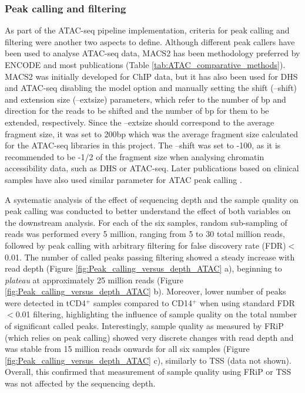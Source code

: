 \subsubsection{Peak calling and filtering}
\label{peak_filtering}
As part of the ATAC-seq pipeline implementation, criteria for peak calling and filtering were another two aspects to define. Although different peak callers have been used to analyse ATAC-seq data, MACS2 has been methodology preferred by ENCODE and most publications (Table \ref{tab:ATAC_comparative_methods}). MACS2 was initially developed for ChIP data, but it has also been used for DHS and ATAC-seq disabling the model option and manually setting the shift (--shift) and extension size (--extsize) parameters, which refer to the number of bp and direction for the reads to be shifted and the number of bp for them to be extended, respectively. Since the --extsize should correspond to the average fragment size, it was set to 200bp which was the average fragment size calculated for the ATAC-seq libraries in this project. The --shift was set to -100, as it is recommended to be -1/2 of the fragment size when analysing chromatin accessibility data, such as DHS or ATAC-seq. Later publications based on clinical samples have also used similar parameter for ATAC peak calling \parencite{Wang2018}. 

A systematic analysis of the effect of sequencing depth and the sample quality on peak calling was conducted to better understand the effect of both variables on the downstream analysis. For each of the six samples, random sub-sampling of reads was performed every 5 million, ranging from 5 to 30 total million reads, followed by peak calling with arbitrary filtering for false discovery rate (FDR)$<$0.01. The number of called peaks passing filtering showed a steady increase with read depth  (Figure \ref{fig:Peak_calling_versus_depth_ATAC} a), beginning to \textit{plateau} at approximately 25 million reads (Figure \ref{fig:Peak_calling_versus_depth_ATAC} b). Moreover, lower number of peaks were detected in tCD4$^+$ samples compared to CD14$^+$ when using standard  FDR$<$0.01 filtering, highlighting the influence of sample quality on the total number of significant called peaks. Interestingly, sample quality as measured by FRiP (which relies on peak calling) showed very discrete changes with read depth and was stable from 15 million reads onwards for all six samples (Figure \ref{fig:Peak_calling_versus_depth_ATAC} c), similarly to TSS (data not shown). Overall, this confirmed that measurement of sample quality using FRiP or TSS was not affected by the sequencing depth.


